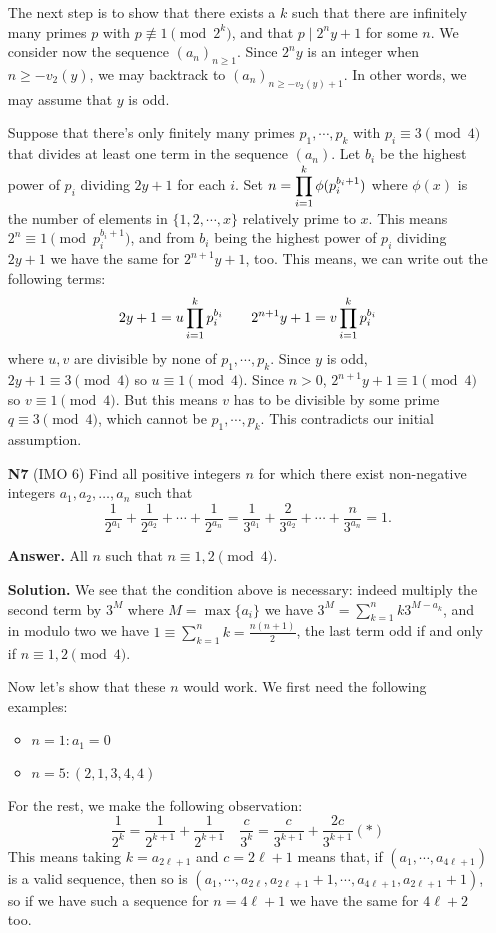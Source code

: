 \documentclass[11pt,a4paper]{article}
\begin{document}
\begin{enumerate}
	The next step is to show that there exists a $k$ such that there are infinitely many primes $p$ with $p\not\equiv 1\pmod{2^k}$, and that $p\mid 2^ny+1$ for some $n$. We consider now the sequence $(a_n)_{n\ge 1}$. Since $2^ny$ is an integer when $n\ge -v_2(y)$, we may backtrack to $(a_n)_{n\ge -v_2(y)+1}$. In other words, we may assume that $y$ is odd. 
	
	Suppose that there's only finitely many primes $p_1, \cdots , p_k$ with $p_i\equiv 3\pmod{4}$ that divides at least one term in the sequence $(a_n)$. Let $b_i$ be the highest power of $p_i$ dividing $2y+1$ for each $i$. Set $n=\displaystyle\prod_{i=1}^k \phi(p_i^{b_i+1})$ where $\phi(x)$ is the number of elements in $\{1, 2, \cdots , x\}$ relatively prime to $x$. 
	This means $2^n\equiv 1\pmod{p_i^{b_i+1}}$, and from $b_i$ being the highest power of $p_i$ dividing $2y+1$ we have the same for $2^{n+1}y+1$, too. 
	This means, we can write out the following terms: 
	\[
	2y+1 = u\displaystyle\prod_{i=1}^k p_i^{b_i}\qquad 2^{n+1}y+1 = v\displaystyle\prod_{i=1}^k p_i^{b_i}
	\]
	where $u, v$ are divisible by none of $p_1, \cdots, p_k$. Since $y$ is odd, $2y+1\equiv 3\pmod{4}$ so $u\equiv 1\pmod{4}$. 
	Since $n>0$, $2^{n+1}y+1\equiv 1\pmod{4}$ so $v\equiv 1\pmod{4}$. 
	But this means $v$ has to be divisible by some prime $q\equiv 3\pmod{4}$, which cannot be $p_1, \cdots, p_k$. This contradicts our initial assumption. 
	
	\item[\textbf{N7}] (IMO 6)
	Find all positive integers $n$ for which there exist non-negative integers $a_1, a_2, \ldots, a_n$ such that
	\[
	\frac{1}{2^{a_1}} + \frac{1}{2^{a_2}} + \cdots + \frac{1}{2^{a_n}} = 
	\frac{1}{3^{a_1}} + \frac{2}{3^{a_2}} + \cdots + \frac{n}{3^{a_n}} = 1.
	\]
	
	\textbf{Answer.} All $n$ such that $n\equiv 1, 2\pmod{4}$. 
	
	\textbf{Solution.} We see that the condition above is necessary: 
	indeed multiply the second term by $3^M$ where $M=\max\{a_i\}$ we have 
	$3^M=\sum_{k=1}^n k3^{M-a_k}$, 
	and in modulo two we have $1\equiv \sum_{k=1}^n k = \frac{n(n+1)}{2}$, 
	the last term odd if and only if $n\equiv 1, 2\pmod{4}$. 
	
	Now let's show that these $n$ would work. We first need the following examples: 
	\begin{itemize}
		\item $n=1: a_1=0$
		\item $n=5: (2,1,3,4,4)$
	\end{itemize}
    For the rest, we make the following observation: 
    \[
    \frac{1}{2^{k}}=\frac{1}{2^{k+1}}+\frac{1}{2^{k+1}}\quad 
    \frac{c}{3^k} = \frac{c}{3^{k+1}} + \frac{2c}{3^{k+1}} (*)
    \]
    This means taking $k=a_{2\ell+1}$ and $c=2\ell+1$ means that, 
    if $(a_1, \cdots, a_{4\ell+1})$ is a valid sequence, then so is 
    $(a_1, \cdots, a_{2\ell}, a_{2\ell+1}+1, \cdots, a_{4\ell+1}, a_{2\ell+1}+1)$, 
    so if we have such a sequence for $n=4\ell+1$ we have the same for $4\ell+2$ too. 
    

\end{enumerate}
\end{document}
